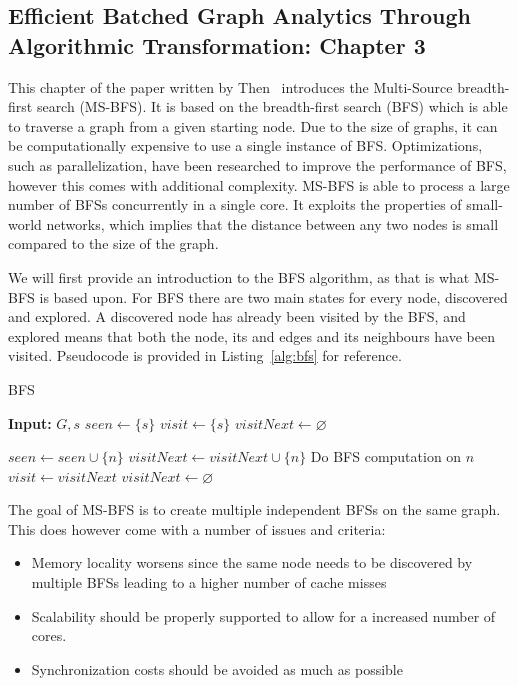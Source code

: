 \subsection{Efficient Batched Graph Analytics Through Algorithmic Transformation: Chapter 3}
This chapter of the paper written by Then~\cite{10.14778/2735496.2735507} introduces the Multi-Source breadth-first search (MS-BFS). It is based on the breadth-first search (BFS) which is able to traverse a graph from a given starting node. Due to the size of graphs, it can be computationally expensive to use a single instance of BFS. Optimizations, such as parallelization, have been researched to improve the performance of BFS, however this comes with additional complexity. MS-BFS is able to process a large number of BFSs concurrently in a single core. It exploits the properties of small-world networks, which implies that the distance between any two nodes is small compared to the size of the graph. 

We will first provide an introduction to the BFS algorithm, as that is what MS-BFS is based upon. 
For BFS there are two main states for every node, discovered and explored. A discovered node has already been visited by the BFS, and explored means that both the node, its and edges and its neighbours have been visited. Pseudocode is provided in Listing~\ref{alg:bfs} for reference. 

\begin{algorithm}
\caption{BFS}
\label{alg:bfs}
\begin{algorithmic}[1]
    \State \textbf{Input:} $G,s$
    \State $seen \leftarrow \{s\}$
    \State $visit \leftarrow \{s\}$
    \State $visitNext \leftarrow \varnothing$
    
                \State $seen \leftarrow seen \cup \{n\}$
                \State $visitNext \leftarrow visitNext \cup \{n\}$
                \State Do BFS computation on $n$
                \EndIf
            \EndFor
        \EndFor
        \State $visit \leftarrow visitNext$
        \State $visitNext \leftarrow \varnothing$
    \EndWhile   
\end{algorithmic}
\end{algorithm}

The goal of MS-BFS is to create multiple independent BFSs on the same graph. This does however come with a number of issues and criteria: 
\begin{itemize}
    \item Memory locality worsens since the same node needs to be discovered by multiple BFSs leading to a higher number of cache misses
    \item Scalability should be properly supported to allow for a increased number of cores. 
    \item Synchronization costs should be avoided as much as possible
\end{itemize}


